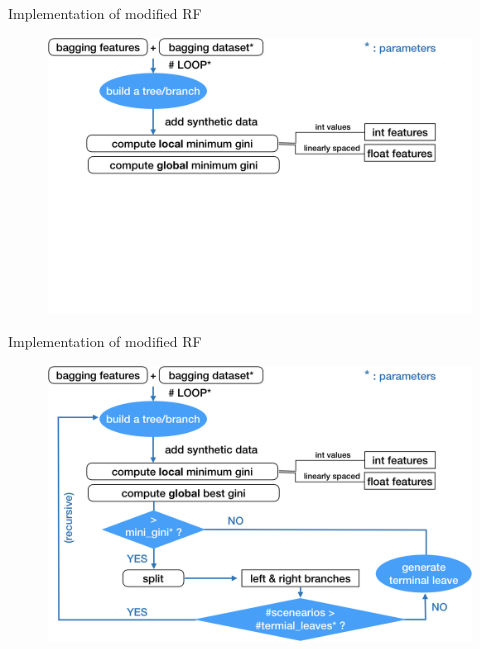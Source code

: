 \documentclass[shortpres]{beamer}
\begin{document}
  \begin{frame}{Implementation of modified RF}
    \begin{figure}
      \includegraphics[height=0.8\textheight]{fig/decisiontree_diagram0.png}
    \end{figure}
    \end{frame}
  \begin{frame}{Implementation of modified RF}	
    \begin{figure}
      \includegraphics[height=0.8\textheight]{fig/decisiontree_diagram.png}
    \end{figure}
    \end{frame}
\end{document}
